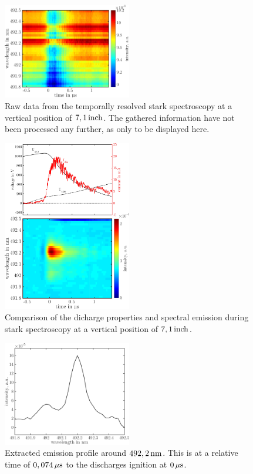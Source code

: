 \documentclass[a4paper,10pt,twoside]{article}
\begin{document}
				\begin{figure}
					\centering
					\includegraphics[width=0.5\textwidth]{figures/stark/stark_71inraw.pdf}
					\caption{Raw data from the temporally resolved stark spectroscopy at a vertical position of $\unit[7,1]{inch}$. The gathered information have not been processed any further, as only to be displayed here.}
				\end{figure}

				\begin{figure}
					\centering
					\includegraphics[width=0.5\textwidth]{figures/stark/stark71combination.pdf}
					\caption{Comparison of the dicharge properties and spectral emission during stark spectroscopy at a vertical position of $\unit[7,1]{inch}$. }
					\label{img:stark71comparison}
				\end{figure}

				\begin{figure}
					\centering
					\includegraphics[width=0.5\textwidth]{figures/stark/stark_shift71in.pdf}
					\caption{Extracted emission profile around $\unit[492,2]{nm}$. This is at a relative time of $\unit[0,074]{\mu s}$ to the discharges ignition at $\unit[0]{\mu s}$.}
					\label{img:starkshift71}
				\end{figure}
\end{document}
